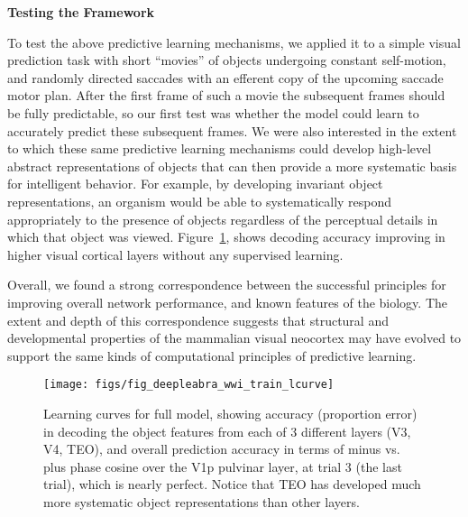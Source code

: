 \documentclass[10pt,twocolumn]{article}
\newif\myifpdf
\begin{document}
\begin{center}
\textbf{Testing the Framework}
\end{center}

To test the above predictive learning mechanisms, we applied it to a simple visual prediction task with short ``movies'' of objects undergoing constant self-motion, and randomly directed saccades with an efferent copy of the upcoming saccade motor plan.  After the first frame of such a movie the subsequent frames should be fully predictable, so our first test was whether the model could learn to accurately predict these subsequent frames.  We were also interested in the extent to which these same predictive learning mechanisms could develop high-level abstract representations of objects that can then provide a more systematic basis for intelligent behavior.  For example, by developing invariant object representations, an organism would be able to systematically respond appropriately to the presence of objects regardless of the perceptual details in which that object was viewed.  Figure~\ref{fig.train_lcurve}, shows decoding accuracy improving in higher visual cortical layers without any supervised learning.

Overall, we found a strong correspondence between the successful principles for improving overall network performance, and known features of the biology.  The extent and depth of this correspondence suggests that structural and developmental properties of the mammalian visual neocortex may have evolved to support the same kinds of computational principles of predictive learning.

\begin{figure}
      \texttt{[image: figs/fig\_deepleabra\_wwi\_train\_lcurve]}
  \caption{Learning curves for full model, showing accuracy (proportion error) in decoding the object features from each of 3 different layers (V3, V4, TEO), and overall prediction accuracy in terms of minus vs. plus phase cosine over the V1p pulvinar layer, at trial 3 (the last trial), which is nearly perfect. Notice that TEO has developed much more systematic object representations than other layers.} \label{fig.train_lcurve}
\end{figure}


\end{document}
